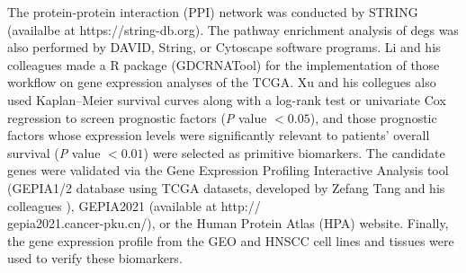 \documentclass[preprint,12pt]{elsarticle}
\newenvironment{MyColorPar}[1]{%
    \leavevmode\color{#1}\ignorespaces%
}{%
}%
\begin{document}
\begin{MyColorPar}{blue}
\begin{MyColorPar}{red}
The protein-protein interaction (PPI) network was conducted by STRING (availalbe at https://string-db.org).
The pathway enrichment analysis of \acrshort{degs} was also performed by DAVID, String, or Cytoscape software programs\cite{Huang2019}\cite{Shen2019}.
Li\cite{Li2018a} and his colleagues made a R package (GDCRNATool) for the implementation of those workflow on gene expression analyses of the TCGA.
Xu and his collegues\cite{Xu2021a} also used Kaplan–Meier survival curves along with a log-rank test or univariate Cox regression to screen prognostic factors (\textit{P} value $< 0.05$), and those prognostic factors whose expression levels were significantly relevant to patients' overall survival (\textit{P} value $< 0.01$) were selected as primitive biomarkers.
The candidate genes were validated via the Gene Expression Profiling Interactive Analysis tool (GEPIA1/2 database using TCGA datasets, developed by Zefang Tang and his colleagues\cite{Tang2017a}\cite{Tang2019}
), GEPIA2021\cite{Li2021} (available at http://\\gepia2021.cancer-pku.cn/), or the Human Protein Atlas (HPA) website.
Finally, the gene expression profile from the GEO and HNSCC cell lines and tissues were used to verify these biomarkers.\\



\end{MyColorPar}
\end{MyColorPar}
\end{document}
